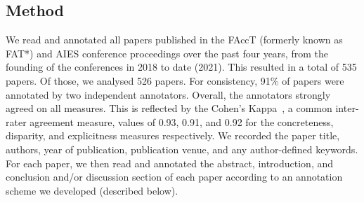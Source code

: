 \documentclass[manuscript]{acmart}
\begin{document}
\subsection{Method} 
We read and annotated all papers published in the FAccT (formerly known as FAT*) and AIES conference proceedings over the past four years, from the founding of the conferences in 2018 to date (2021). This resulted in a total of 535 papers. Of those, we analysed 526 papers. For consistency, 91\% of papers were annotated by two independent annotators. Overall, the annotators strongly agreed on all measures. This is reflected by the Cohen's Kappa~\cite{cohen1960coefficient}, a common inter-rater agreement measure, values of 0.93, 0.91, and 0.92 for the concreteness, disparity, and explicitness measures respectively. We recorded the paper title, authors, year of publication, publication venue, and any author-defined keywords. For each paper, we then read and annotated the abstract, introduction, and conclusion and/or discussion section of each paper according to an annotation scheme we developed (described below).
\end{document}
